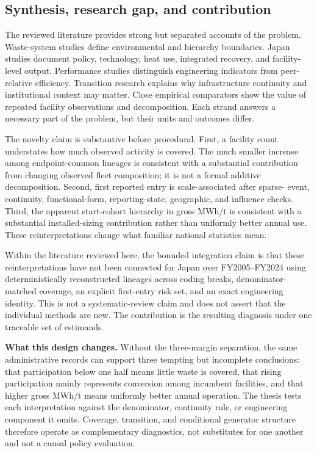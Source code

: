 \documentclass[12pt,a4paper]{article}
\begin{document}
\subsection{Synthesis, research gap, and contribution}

The reviewed literature provides strong but separated accounts of the problem.
Waste-system studies define environmental and hierarchy boundaries. Japan
studies document policy, technology, heat use, integrated recovery, and
facility-level output. Performance studies distinguish engineering indicators
from peer-relative efficiency. Transition research explains why infrastructure
continuity and institutional context may matter. Close empirical comparators
show the value of repeated facility observations and decomposition. Each strand
answers a necessary part of the problem, but their units and outcomes differ.

The novelty claim is substantive before procedural. First, a facility count
understates how much observed activity is covered. The much smaller increase
among endpoint-common lineages is consistent with a substantial contribution
from changing observed fleet composition; it is not a formal additive
decomposition. Second, first reported entry is scale-associated after sparse-
event, continuity, functional-form, reporting-state, geographic, and influence
checks. Third, the apparent start-cohort hierarchy in gross MWh/t is consistent
with a substantial installed-sizing contribution rather than uniformly better
annual use. These reinterpretations change what familiar national statistics
mean.

Within the literature reviewed here, the bounded integration claim is that
these reinterpretations have not been connected for Japan over FY2005--FY2024
using deterministically reconstructed lineages across coding breaks, denominator-matched coverage, an
explicit first-entry risk set, and an exact engineering identity. This is not a
systematic-review claim and does not assert that the individual methods are new.
The contribution is the resulting diagnosis under one traceable set of
estimands.

\noindent\textbf{What this design changes.} Without the three-margin separation,
the same administrative records can support three tempting but incomplete
conclusions: that participation below one half means little waste is covered,
that rising participation mainly represents conversion among incumbent
facilities, and that higher gross MWh/t means uniformly better annual
operation. The thesis tests each interpretation against the denominator,
continuity rule, or engineering component it omits. Coverage, transition, and
conditional generator structure therefore operate as complementary
diagnostics, not substitutes for one another and not a causal policy evaluation.
\end{document}
